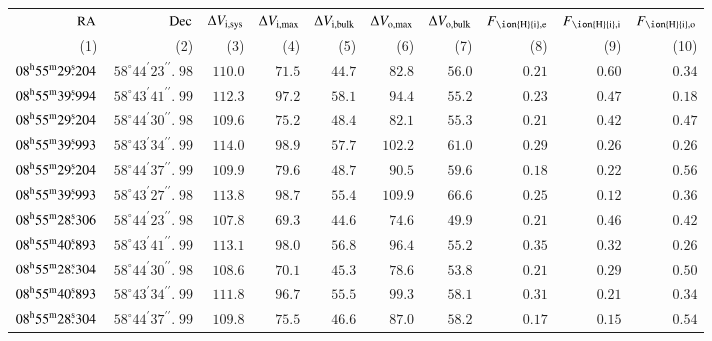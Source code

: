 \documentclass[oldversion]{aa}
\newcommand{\hmsm}[4]{{#1}^{\rm h}{#2}^{\rm m}{#3}^{\rm s}\!\!.\:\!{#4}}
\newcommand{\dmsm}[4]{\, {#1}^{\circ}{#2}^{\prime}{#3}^{\prime\prime}\!\!\!.\;\!{#4}}
\begin{document}
\begin{table}[htbp]
\begin{center}
\begin{tabular}{r r r r r r r r r r}
$ \rm RA $ & $ \rm Dec $ & $\Delta V_{\rm i,sys} $ & $\Delta V_{\rm i,max} $ & $\Delta V_{\rm i,bulk} $ & $\Delta V_{\rm o,max} $ & $\Delta V_{\rm o,bulk} $ & $F_{\rm {\ion{H}{i}},e}$ & $F_{\rm {\ion{H}{i}},i}$ & $F_{\rm {\ion{H}{i}},o}$ \\ 
(1)           & (2)           & (3)                 & (4)               & (5)                     & (6)                         & (7)                                 & (8)      & (9)              & (10)          \\
\hline
$ \hmsm{08}{55}{29}{204} $ & $ \dmsm{58}{44}{23}{98} $ & $ 110.0  $ & $  71.5  $ & $  44.7  $ & $  82.8  $ & $  56.0  $ & $  0.21  $ & $  0.60  $ & $  0.34  $ \\
$ \hmsm{08}{55}{39}{994} $ & $ \dmsm{58}{43}{41}{99} $ & $ 112.3  $ & $  97.2  $ & $  58.1  $ & $  94.4  $ & $  55.2  $ & $  0.23  $ & $  0.47  $ & $  0.18  $ \\
$ \hmsm{08}{55}{29}{204} $ & $ \dmsm{58}{44}{30}{98} $ & $ 109.6  $ & $  75.2  $ & $  48.4  $ & $  82.1  $ & $  55.3  $ & $  0.21  $ & $  0.42  $ & $  0.47  $ \\
$ \hmsm{08}{55}{39}{993} $ & $ \dmsm{58}{43}{34}{99} $ & $ 114.0  $ & $  98.9  $ & $  57.7  $ & $ 102.2  $ & $  61.0  $ & $  0.29  $ & $  0.26  $ & $  0.26  $ \\
$ \hmsm{08}{55}{29}{204} $ & $ \dmsm{58}{44}{37}{99} $ & $ 109.9  $ & $  79.6  $ & $  48.7  $ & $  90.5  $ & $  59.6  $ & $  0.18  $ & $  0.22  $ & $  0.56  $ \\
$ \hmsm{08}{55}{39}{993} $ & $ \dmsm{58}{43}{27}{98} $ & $ 113.8  $ & $  98.7  $ & $  55.4  $ & $ 109.9  $ & $  66.6  $ & $  0.25  $ & $  0.12  $ & $  0.36  $ \\
$ \hmsm{08}{55}{28}{306} $ & $ \dmsm{58}{44}{23}{98} $ & $ 107.8  $ & $  69.3  $ & $  44.6  $ & $  74.6  $ & $  49.9  $ & $  0.21  $ & $  0.46  $ & $  0.42  $ \\
$ \hmsm{08}{55}{40}{893} $ & $ \dmsm{58}{43}{41}{99} $ & $ 113.1  $ & $  98.0  $ & $  56.8  $ & $  96.4  $ & $  55.2  $ & $  0.35  $ & $  0.32  $ & $  0.26  $ \\
$ \hmsm{08}{55}{28}{304} $ & $ \dmsm{58}{44}{30}{98} $ & $ 108.6  $ & $  70.1  $ & $  45.3  $ & $  78.6  $ & $  53.8  $ & $  0.21  $ & $  0.29  $ & $  0.50  $ \\
$ \hmsm{08}{55}{40}{893} $ & $ \dmsm{58}{43}{34}{99} $ & $ 111.8  $ & $  96.7  $ & $  55.5  $ & $  99.3  $ & $  58.1  $ & $  0.31  $ & $  0.21  $ & $  0.34  $ \\
$ \hmsm{08}{55}{28}{304} $ & $ \dmsm{58}{44}{37}{99} $ & $ 109.8  $ & $  75.5  $ & $  46.6  $ & $  87.0  $ & $  58.2  $ & $  0.17  $ & $  0.15  $ & $  0.54  $ \\

\end{tabular}
\end{center}
\end{table}
\end{document}
